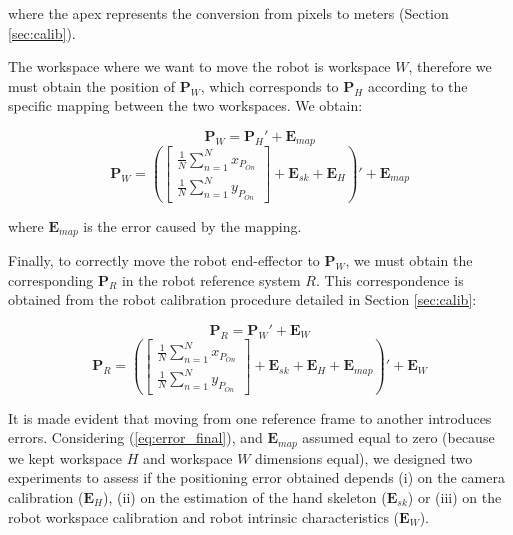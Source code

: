 \documentclass[a4paper, 10 pt, conference]{ieeeconf}      %
\begin{document}
where the apex represents the conversion from pixels to meters (Section \ref{sec:calib}).

The workspace where we want to move the robot is workspace $W$, therefore we must obtain the position of $\mathbf{P}_W$, which corresponds to $\mathbf{P}_H$ according to the specific mapping between the two workspaces. We obtain:

\begin{equation}
\mathbf{P}_W = \mathbf{P}_H' + \mathbf{E}_{map}
\end{equation}
\begin{equation}
\mathbf{P}_W = \left(\begin{bmatrix}
\frac{1}{N}\sum_{n=1}^{N}x_{P_{On}} \\
\frac{1}{N}\sum_{n=1}^{N}y_{P_{On}}
\end{bmatrix} + \mathbf{E}_{sk} + \mathbf{E}_{H}\right)' + \mathbf{E}_{map}
\end{equation}

where $\mathbf{E}_{map}$ is the error caused by the mapping.

Finally, to correctly move the robot end-effector to $\mathbf{P}_W$, we must obtain the corresponding $\mathbf{P}_R$ in the robot reference system $R$. This correspondence is obtained from the robot calibration procedure detailed in Section \ref{sec:calib}: 

\begin{equation}
\mathbf{P}_R = \mathbf{P}_W' + \mathbf{E}_W
\end{equation}
\begin{equation}\label{eq:error_final}
\mathbf{P}_R = \left(\begin{bmatrix}
\frac{1}{N}\sum_{n=1}^{N}x_{P_{On}} \\
\frac{1}{N}\sum_{n=1}^{N}y_{P_{On}}
\end{bmatrix} + \mathbf{E}_{sk} + \mathbf{E}_{H} + \mathbf{E}_{map} \right)' + \mathbf{E}_W
\end{equation}

It is made evident that moving from one reference frame to another introduces errors. Considering (\ref{eq:error_final}), and $\mathbf{E}_{map}$ assumed equal to zero (because we kept workspace $H$ and workspace $W$ dimensions equal), we designed two experiments to assess if the positioning error obtained depends (i) on the camera calibration ($\mathbf{E}_{H}$), (ii) on the estimation of the hand skeleton ($\mathbf{E}_{sk}$) or (iii) on the robot workspace calibration and robot intrinsic characteristics ($\mathbf{E}_{W}$).
\end{document}
